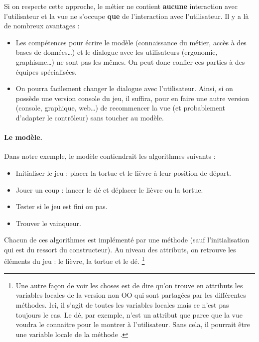 		Si on respecte cette approche, 
		le métier ne contient \textbf{aucune} interaction avec l'utilisateur
		et la vue ne s'occupe \textbf{que} de l'interaction avec l'utilisateur.
		Il y a là de nombreux avantages :
		\begin{itemize}
		\item
			Les compétences pour écrire le modèle
			(connaissance du métier, accès à des bases de données\dots)
			et le dialogue avec les utilisateurs 
			(ergonomie, graphisme\dots)
			ne sont pas les mêmes.
			On peut donc confier ces parties à des équipes spécialisées.
		\item
			On pourra facilement changer le dialogue avec l'utilisateur.
			Ainsi, si on possède une version console du jeu,
			il suffira, pour en faire une autre version 
			(console, graphique, web\dots)
			de recommencer la vue 
			(et probablement d'adapter le contrôleur)
			sans toucher au modèle.
		\end{itemize}
	
		\paragraph{Le modèle.}
		Dans notre exemple, le modèle contiendrait les algorithmes suivants :
		\begin{itemize}
		\item
			Initialiser le jeu : 
			placer la tortue et le lièvre à leur position de départ.
		\item
			Jouer un coup : 
			lancer le dé et déplacer le lièvre ou la tortue.
		\item
			Tester si le jeu est fini ou pas.
		\item
			Trouver le vainqueur.
		\end{itemize}

		Chacun de ces algorithmes est implémenté par une méthode
		(sauf l'initialisation qui est du ressort du constructeur).
		Au niveau des attributs, 
		on retrouve les éléments du jeu : le lièvre, la tortue et le dé.
		\footnote{%
			Une autre façon de voir les choses
			est de dire qu'on trouve en attributs
			les variables locales de la version non OO
			qui sont partagées par les différentes méthodes.
			Ici, il s'agit de toutes les variables locales
			mais ce n'est pas toujours le cas.
			Le dé, par exemple, n'est un attribut que parce que
			la vue voudra le connaitre pour le montrer à l'utilisateur.
			Sans cela, il pourrait être une variable locale
			de la méthode .
		}
		
